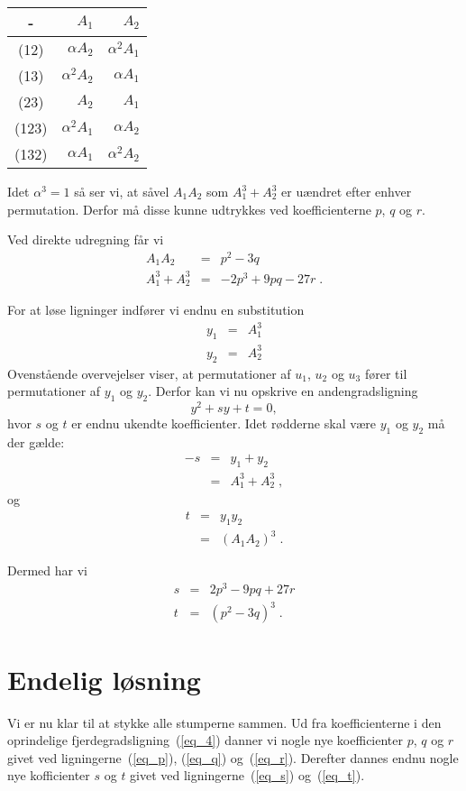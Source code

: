 \documentclass[12pt,oneside,a4paper]{article}
\newcommand{\bas}{\begin{eqnarray*}}
\newcommand{\eas}{\end{eqnarray*}}
\newcommand{\bea}{\begin{eqnarray}}
\newcommand{\eea}{\end{eqnarray}}
\begin{document}
\begin{tabular}{|c|r|r|}
    \hline 
    -    & $A_1$ & $ A_2$ \\
    \hline 
    (12) & $\alpha A_2$ & $\alpha^2 A_1$ \\
    (13) & $\alpha^2 A_2$ & $\alpha A_1$ \\
    (23) & $A_2$ & $A_1$ \\
    \hline 
    (123) & $\alpha^2 A_1$ & $\alpha A_2$ \\
    (132) & $\alpha A_1$ & $\alpha^2 A_2$ \\
    \hline
\end{tabular}

Idet $\alpha^3 = 1$ så ser vi, at såvel $A_1A_2$ som $A_1^3 + A_2^3$ er
uændret efter enhver permutation. Derfor må disse kunne udtrykkes 
ved koefficienterne $p$, $q$ og $r$.

Ved direkte udregning får vi
\bea
A_1A_2 &=& p^2 - 3q \label{eq_a1a2}\\
A_1^3 + A_2^3 &=& -2p^3 + 9pq - 27r \;.
\eea

For at løse ligninger indfører vi endnu en substitution
\bea
y_1 &=& A_1^3 \label{eq_y1}\\
y_2 &=& A_2^3 \label{eq_y2}
\eea
Ovenstående overvejelser viser, at permutationer af $u_1$, $u_2$ og $u_3$
fører til permutationer af $y_1$ og $y_2$. Derfor kan vi nu 
opskrive en andengradsligning
\begin{equation}
y^2 + sy + t = 0,
\label{eq_y}
\end{equation}
hvor $s$ og $t$ er endnu ukendte koefficienter. Idet rødderne skal være $y_1$
og $y_2$ må der gælde:
\bas
-s &=& y_1 + y_2 \\
&=& A_1^3 + A_2^3 \;,
\eas
og
\bas
t &=& y_1 y_2 \\
&=& (A_1 A_2)^3 \;.
\eas

Dermed har vi
\bea
s &=& 2p^3 - 9pq + 27r \label{eq_s}\\
t &=& (p^2-3q)^3 \label{eq_t}  \;.
\eea

\section{Endelig løsning}
Vi er nu klar til at stykke alle stumperne sammen.
Ud fra koefficienterne i den oprindelige fjerdegradsligning~(\ref{eq_4}) danner
vi nogle nye koefficienter $p$, $q$ og $r$ givet ved
ligningerne~(\ref{eq_p}), (\ref{eq_q}) og~(\ref{eq_r}).
Derefter dannes endnu nogle nye kofficienter $s$ og $t$ givet ved
ligningerne~(\ref{eq_s}) og~(\ref{eq_t}).
\end{document}
